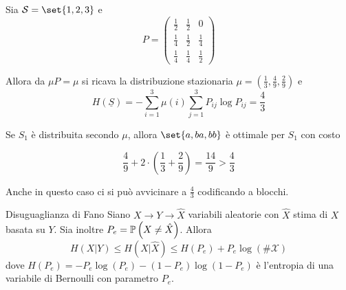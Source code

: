 \begin{example}{}
  Sia \(\SCal = \set{1,2,3}\) e 
  \begin{equation*}
    \renewcommand{\arraystretch}{1.5} %
    P = \begin{pmatrix}
      \frac{1}{2} & \frac{1}{2} & 0 \\
      \frac{1}{4} & \frac{1}{2} & \frac{1}{4} \\
      \frac{1}{4} & \frac{1}{4} & \frac{1}{2}
    \end{pmatrix}
  \end{equation*}
  
  Allora da \(\mu P = \mu\) si ricava la distribuzione stazionaria \(\mu = \left(\frac{1}{3}, \frac{4}{9}, \frac{2}{9}\right)\) e 
  \[H(\underline{S}) = -\sum_{i=1}^3 \mu(i)\sum_{j=1}^3 P_{ij} \log P_{ij} = \frac{4}{3}\]

  Se \(S_1\) è distribuita secondo \(\mu\), allora \(\set{a,ba,bb}\) è ottimale per \(S_1\) con costo 
  
  \[\frac{4}{9} + 2\cdot (\frac{1}{3} + \frac{2}{9}) = \frac{14}{9} > \frac{4}{3}\]

  Anche in questo caso ci si può avvicinare a \(\frac{4}{3}\) codificando a blocchi.
\end{example}

\begin{theorem}[label=thm:fano]{Disuguaglianza di Fano}
  Siano \(X \to Y \to \hat{X}\) variabili aleatorie con \(\hat{X}\) stima di \(X\) basata su \(Y\).
  Sia inoltre \(P_e = \Prob[X\neq\hat{X}]\). Allora
  \[H(X|Y) \leq H(X|\hat{X})\leq H(P_e)+P_e\log(\#\mathcal{X})\]
  dove \(H(P_e) = -P_e \log (P_e) - (1-P_e)\log(1-P_e)\) è l'entropia di una variabile di Bernoulli con parametro \(P_e\).
\end{theorem}

